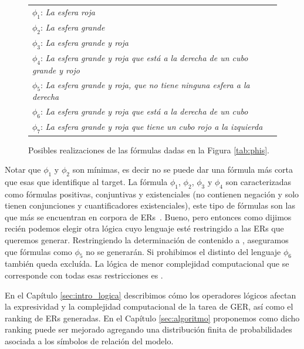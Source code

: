 \begin{figure}[h]

\begin{tabular}{l}
 $\phi_1$: {\it La esfera roja}\\[1pt]
 $\phi_2$: {\it La esfera grande}\\[1pt]
 $\phi_3$: {\it La esfera grande y roja}\\[1pt]
 $\phi_4$: {\it La esfera grande y roja que est\'a a la derecha de un cubo grande y rojo}\\[1pt]
 $\phi_5$: {\it La esfera grande y roja, que no tiene ninguna esfera a la derecha}\\[1pt]
 $\phi_6$: {\it La esfera grande y roja que est\'a a la derecha de un cubo}\\[1pt]
 $\phi_7$: {\it La esfera grande y roja que tiene un cubo rojo a la izquierda}\\[1pt]
\end{tabular}
\caption{Posibles realizaciones de las f\'ormulas dadas en la Figura \protect\ref{tab:phis}.}\label{tab:realizaciones-phis}
\end{figure}

Notar que $\phi_1$ y $\phi_2$ son m\'inimas, es decir no se puede dar una f\'ormula m\'as corta que esas que identifique al target.
La f\'ormula $\phi_1$, $\phi_2$, $\phi_3$ y $\phi_4$ son caracterizadas como f\'ormulas positivas, conjuntivas y existenciales (no contienen negaci\'on y solo tienen conjunciones y cuantificadores existenciales), este tipo de f\'ormulas son las que m\'as se encuentran en corpora de ERs~\cite{viethen06:_algor_for_gener_refer_expres,deemter06:_build_seman_trans_corpus_for,gre3d3}. Bueno, pero entonces como dijimos reci\'en podemos elegir otra l\'ogica cuyo lenguaje est\'e restringido a las ERs que queremos generar. Restringiendo la determinaci\'on de contenido a \EPFOL, aseguramos que f\'ormulas como  $\phi_5$ no se generar\'an. Si prohibimos el distinto del lenguaje $\phi_6$ tambi\'en queda exclu\'ida. La l\'ogica de menor complejidad computacional que se corresponde con todas esas restricciones es \EL. 

En el Cap\'itulo \ref{sec:intro_logica} describimos c\'omo los operadores l\'ogicos afectan la expresividad y la complejidad computacional de la tarea de GER, as\'i como el ranking de ERs generadas. En el Cap\'itulo \ref{sec:algoritmo} proponemos como dicho ranking puede ser mejorado agregando una distribuci\'on finita de probabilidades asociada a los s\'imbolos de relaci\'on del modelo.




